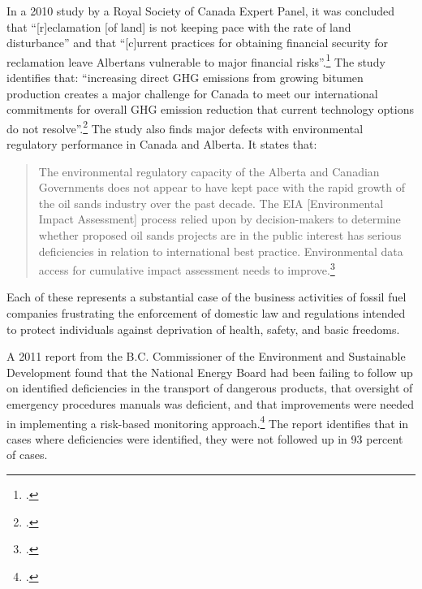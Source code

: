 \documentclass[10pt]{article}
\begin{document}
In a 2010 study by a Royal Society of Canada Expert Panel, it was concluded that ``[r]eclamation [of land] is not keeping pace with the rate of land disturbance'' and that ``[c]urrent practices for obtaining financial security for reclamation leave Albertans vulnerable to major financial risks''.\footcite[][p. 5]{RoyalSocEnvHealth}
The study identifies that: ``increasing direct GHG emissions from growing bitumen production creates a major challenge for Canada to meet our international commitments for overall GHG emission reduction that current technology options do not resolve''.\footcite[][p. 5]{RoyalSocEnvHealth}
The study also finds major defects with environmental regulatory performance in Canada and Alberta.
It states that:
\begin{quote}
The environmental regulatory capacity of the Alberta and Canadian Governments does not appear to have kept pace with the rapid growth of the oil sands industry over the past decade. The EIA [Environmental Impact Assessment] process relied upon by decision-makers to determine whether proposed oil sands projects are in the public interest has serious deficiencies in relation to international best practice. Environmental data access for cumulative impact assessment needs to improve.\footcite[][p. 5]{RoyalSocEnvHealth}
\end{quote}
Each of these represents a substantial case of the business activities of fossil fuel companies frustrating the enforcement of domestic law and regulations intended to protect individuals against deprivation of health, safety, and basic freedoms.



A 2011 report from the B.C. Commissioner of the Environment and Sustainable Development found that the National Energy Board had been failing to follow up on identified deficiencies in the transport of dangerous products, that oversight of emergency procedures manuals was deficient, and that improvements were needed in implementing a risk-based monitoring approach.\footcite[][p. 21, 24, 26]{CESD2011Dec}
The report identifies that in cases where deficiencies were identified, they were not followed up in 93 percent of cases.
\end{document}
